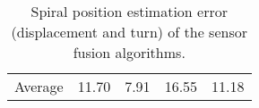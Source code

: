 \begin{table}[H]
\begin{center}
{\begin{tabular}[t]{lcccc}
                \hline
                Average          & 11.70                   & 7.91                   & 16.55           & 11.18
            \end{tabular}
        }
        \caption{Spiral position estimation error (displacement and turn) of the sensor fusion algorithms. }
        \label{tab:spiral}
    \end{center}
\end{table}